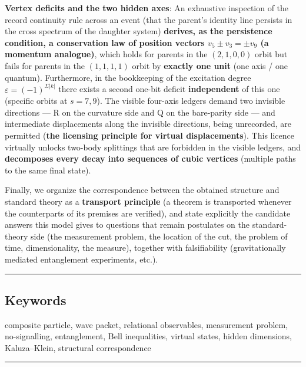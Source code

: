 \documentclass[
]{article}
\begin{document}
\textbf{Vertex deficits and the two hidden axes}: An exhaustive
inspection of the record continuity rule across an event (that the
parent's identity line persists in the cross spectrum of the daughter
system) \textbf{derives, as the persistence condition, a conservation
law of position vectors \(v_5\pm v_3=\pm v_9\) (a momentum analogue)},
which holds for parents in the \((2,1,0,0)\) orbit but fails for parents
in the \((1,1,1,1)\) orbit by \textbf{exactly one unit} (one axis / one
quantum). Furthermore, in the bookkeeping of the excitation degree
\(\varepsilon=(-1)^{\Sigma|k|}\) there exists a second one-bit deficit
\textbf{independent} of this one (specific orbits at \(s=7,9\)). The
visible four-axis ledgers demand two invisible directions --- R on the
curvature side and Q on the bare-parity side --- and intermediate
displacements along the invisible directions, being unrecorded, are
permitted (\textbf{the licensing principle for virtual displacements}).
This licence virtually unlocks two-body splittings that are forbidden in
the visible ledgers, and \textbf{decomposes every decay into sequences
of cubic vertices} (multiple paths to the same final state).

Finally, we organize the correspondence between the obtained structure
and standard theory as a \textbf{transport principle} (a theorem is
transported whenever the counterparts of its premises are verified), and
state explicitly the candidate answers this model gives to questions
that remain postulates on the standard-theory side (the measurement
problem, the location of the cut, the problem of time, dimensionality,
the measure), together with falsifiability (gravitationally mediated
entanglement experiments, etc.).

\begin{center}\rule{0.5\linewidth}{0.5pt}\end{center}

\subsection{Keywords}\label{keywords}

composite particle, wave packet, relational observables, measurement
problem, no-signalling, entanglement, Bell inequalities, virtual states,
hidden dimensions, Kaluza--Klein, structural correspondence

\begin{center}\rule{0.5\linewidth}{0.5pt}\end{center}
\end{document}
